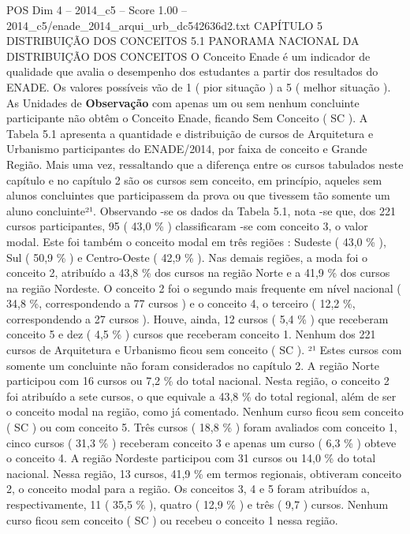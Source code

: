 \begin{textsample}{POS Dim 4 – 2014\_c5 – Score 1.00 – 2014\_c5/enade\_2014\_arqui\_urb\_dc542636d2.txt}  \label{ex:f4_pos_152}
CAPÍTULO 5 DISTRIBUIÇÃO DOS CONCEITOS 5.1 PANORAMA NACIONAL DA DISTRIBUIÇÃO DOS CONCEITOS O Conceito Enade é um indicador de qualidade que avalia o desempenho dos estudantes a partir dos resultados do ENADE.
Os valores possíveis vão de 1 ( pior situação ) a 5 ( melhor situação ).
As Unidades de \textbf{Observação} com apenas um ou sem nenhum concluinte participante não obtêm o Conceito Enade, ficando Sem Conceito ( SC ).
A Tabela 5.1 apresenta a quantidade e distribuição de cursos de Arquitetura e Urbanismo participantes do ENADE/2014, por faixa de conceito e Grande Região.
Mais uma vez, ressaltando que a diferença entre os cursos tabulados neste capítulo e no capítulo 2 são os cursos sem conceito, em princípio, aqueles sem alunos concluintes que participassem da prova ou que tivessem tão somente um aluno concluinte²¹.
Observando -se os dados da Tabela 5.1, nota -se que, dos 221 cursos participantes, 95 ( 43,0 \% ) classificaram -se com conceito 3, o valor modal.
Este foi também o conceito modal em três regiões : Sudeste ( 43,0 \% ), Sul ( 50,9 \% ) e Centro-Oeste ( 42,9 \% ).
Nas demais regiões, a moda foi o conceito 2, atribuído a 43,8 \% dos cursos na região Norte e a 41,9 \% dos cursos na região Nordeste.
O conceito 2 foi o segundo mais frequente em nível nacional ( 34,8 \%, correspondendo a 77 cursos ) e o conceito 4, o terceiro ( 12,2 \%, correspondendo a 27 cursos ).
Houve, ainda, 12 cursos ( 5,4 \% ) que receberam conceito 5 e dez ( 4,5 \% ) cursos que receberam conceito 1.
Nenhum dos 221 cursos de Arquitetura e Urbanismo ficou sem conceito ( SC ). ²¹ Estes cursos com somente um concluinte não foram considerados no capítulo 2.
A região Norte participou com 16 cursos ou 7,2 \% do total nacional.
Nesta região, o conceito 2 foi atribuído a sete cursos, o que equivale a 43,8 \% do total regional, além de ser o conceito modal na região, como já comentado.
Nenhum curso ficou sem conceito ( SC ) ou com conceito 5.
Três cursos ( 18,8 \% ) foram avaliados com conceito 1, cinco cursos ( 31,3 \% ) receberam conceito 3 e apenas um curso ( 6,3 \% ) obteve o conceito 4.
A região Nordeste participou com 31 cursos ou 14,0 \% do total nacional.
Nessa região, 13 cursos, 41,9 \% em termos regionais, obtiveram conceito 2, o conceito modal para a região.
Os conceitos 3, 4 e 5 foram atribuídos a, respectivamente, 11 ( 35,5 \% ), quatro ( 12,9 \% ) e três ( 9,7 ) cursos.
Nenhum curso ficou sem conceito ( SC ) ou recebeu o conceito 1 nessa região.

\end{textsample}
